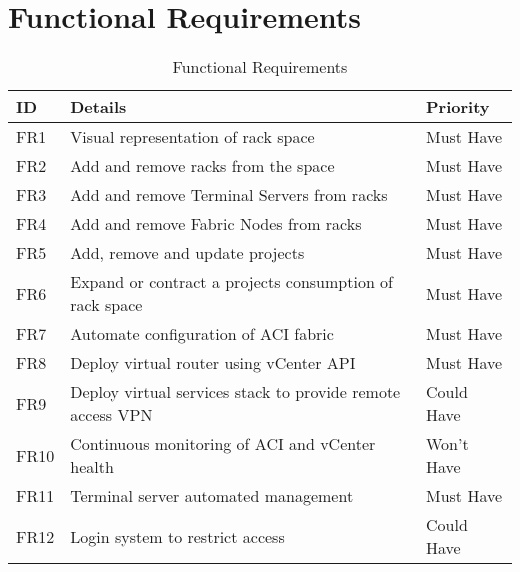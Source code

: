 \section{Functional Requirements}
\label{requirements:functional}
\begin{center}
    \begin{table}[H]
        \begin{tabular}{l l l}
            \hline
            \textbf{ID} & \textbf{Details}
                        & \textbf{Priority}
            \\ \hline
            FR1         & Visual representation of rack space
                        & Must Have
            \\ \hline
            FR2         & Add and remove racks from the space
                        & Must Have
            \\ \hline
            FR3         & Add and remove Terminal Servers from racks
                        & Must Have
            \\ \hline
            FR4         & Add and remove Fabric Nodes from racks
                        & Must Have
            \\ \hline
            FR5         & Add, remove and update projects
                        & Must Have
            \\ \hline
            FR6         & Expand or contract a projects consumption of rack
            space       & Must Have
            \\ \hline
            FR7         & Automate configuration of ACI fabric
                        & Must Have
            \\ \hline
            FR8         & Deploy virtual router using vCenter API
                        & Must Have
            \\ \hline
            FR9         & Deploy virtual services stack to provide remote
            access VPN  & Could
            Have
            \\ \hline
            FR10        & Continuous monitoring of ACI and vCenter health
                        & Won’t Have
            \\
            \hline
            FR11        & Terminal server automated management
                        & Must Have
            \\ \hline
            FR12        & Login system to restrict access                   & 
            Could Have                                                         \\
        \end{tabular}
        \caption{Functional Requirements}
    \end{table}
\end{center}

